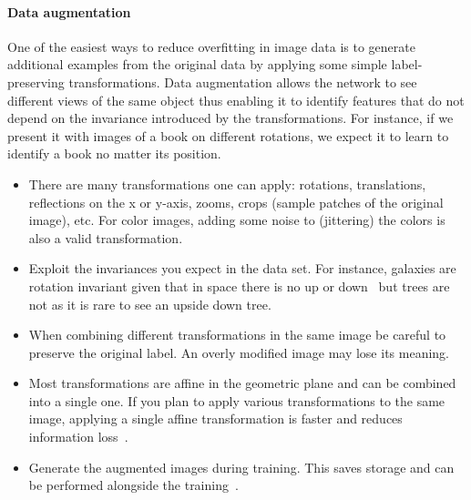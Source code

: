 \paragraph{Data augmentation}
One of the easiest ways to reduce overfitting in image data is to generate additional examples from the original data by applying some simple label-preserving transformations. Data augmentation allows the network to see different views of the same object thus enabling it to identify features that do not depend on the invariance introduced by the transformations. 
For instance, if we present it with images of a book on different rotations, we expect it to learn to identify a book no matter its position.

\begin{itemize}
	\item There are many transformations one can apply: rotations, translations, reflections on the x or y-axis, zooms, crops (sample patches of the original image), etc. For color images, adding some noise to (jittering) the colors is also a valid transformation.

	\item Exploit the invariances you expect in the data set. For instance, galaxies are rotation invariant given that in space there is no up or down~\cite{Dieleman2015} but trees are not as it is rare to see an upside down tree.

	\item When combining different transformations in the same image be careful to preserve the original label. An overly modified image may lose its meaning. 

	\item Most transformations are affine in the geometric plane and can be combined into a single one. If you plan to apply various transformations to the same image, applying a single affine transformation is faster and reduces information loss~\cite{Dieleman2015}.

	\item Generate the augmented images during training. This saves storage and can be performed alongside the training~\cite{Krizhevsky2012}.
	
\end{itemize}

